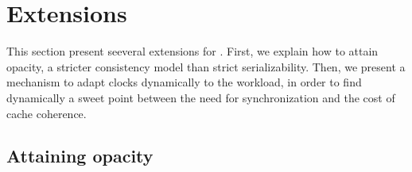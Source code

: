 \section{Extensions}

This section present seeveral extensions for .
First, we explain how to attain opacity, a stricter consistency model than strict serializability.
Then, we present a mechanism to adapt clocks dynamically to the workload, in order to find dynamically a sweet point between the need for synchronization and the cost of cache coherence.

\subsection{Attaining opacity}







